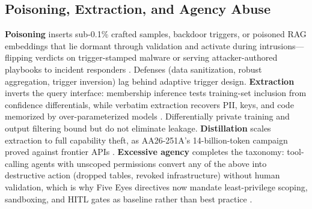 \documentclass[conference,10pt,twocolumn,a4paper]{IEEEtran}
\begin{document}
\subsection{Poisoning, Extraction, and Agency Abuse}
\textbf{Poisoning} inserts sub-0.1\% crafted samples, backdoor triggers, or poisoned RAG embeddings that lie dormant through validation and activate during intrusions---flipping verdicts on trigger-stamped malware or serving attacker-authored playbooks to incident responders \cite{nist_sp_ai_100_2e2025}. Defenses (data sanitization, robust aggregation, trigger inversion) lag behind adaptive trigger design. \textbf{Extraction} inverts the query interface: membership inference tests training-set inclusion from confidence differentials, while verbatim extraction recovers PII, keys, and code memorized by over-parameterized models \cite{carlini2021extracting}. Differentially private training and output filtering bound but do not eliminate leakage. \textbf{Distillation} scales extraction to full capability theft, as AA26-251A's 14-billion-token campaign proved against frontier APIs \cite{cisa_aa26_251a_distillation, carlini2021extracting}. \textbf{Excessive agency} completes the taxonomy: tool-calling agents with unscoped permissions convert any of the above into destructive action (dropped tables, revoked infrastructure) without human validation, which is why Five Eyes directives now mandate least-privilege scoping, sandboxing, and HITL gates as baseline rather than best practice \cite{cisa_agentic_ai_2026}.
\end{document}
